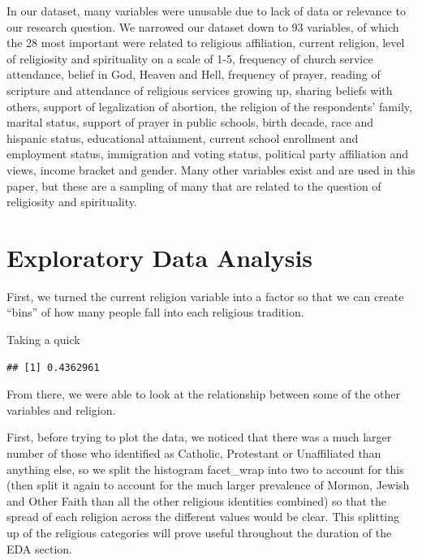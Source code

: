 \documentclass[
]{article}
\newenvironment{Shaded}{\begin{snugshade}}{\end{snugshade}}
\newcommand{\FunctionTok}[1]{\textcolor[rgb]{0.13,0.29,0.53}{\textbf{#1}}}
\newcommand{\NormalTok}[1]{#1}
\newcommand{\SpecialCharTok}[1]{\textcolor[rgb]{0.81,0.36,0.00}{\textbf{#1}}}
\begin{document}
In our dataset, many variables were unusable due to lack of data or
relevance to our research question. We narrowed our dataset down to 93
variables, of which the 28 most important were related to religious
affiliation, current religion, level of religiosity and spirituality on
a scale of 1-5, frequency of church service attendance, belief in God,
Heaven and Hell, frequency of prayer, reading of scripture and
attendance of religious services growing up, sharing beliefs with
others, support of legalization of abortion, the religion of the
respondents' family, marital status, support of prayer in public
schools, birth decade, race and hispanic status, educational attainment,
current school enrollment and employment status, immigration and voting
status, political party affiliation and views, income bracket and
gender. Many other variables exist and are used in this paper, but these
are a sampling of many that are related to the question of religiosity
and spirituality.

\section{Exploratory Data Analysis}\label{exploratory-data-analysis}

First, we turned the current religion variable into a factor so that we
can create ``bins'' of how many people fall into each religious
tradition.

Taking a quick

\begin{Shaded}
\end{Shaded}

\begin{verbatim}
## [1] 0.4362961
\end{verbatim}

From there, we were able to look at the relationship between some of the
other variables and religion.

First, before trying to plot the data, we noticed that there was a much
larger number of those who identified as Catholic, Protestant or
Unaffiliated than anything else, so we split the histogram facet\_wrap
into two to account for this (then split it again to account for the
much larger prevalence of Mormon, Jewish and Other Faith than all the
other religious identities combined) so that the spread of each religion
across the different values would be clear. This splitting up of the
religious categories will prove useful throughout the duration of the
EDA section.
\end{document}
